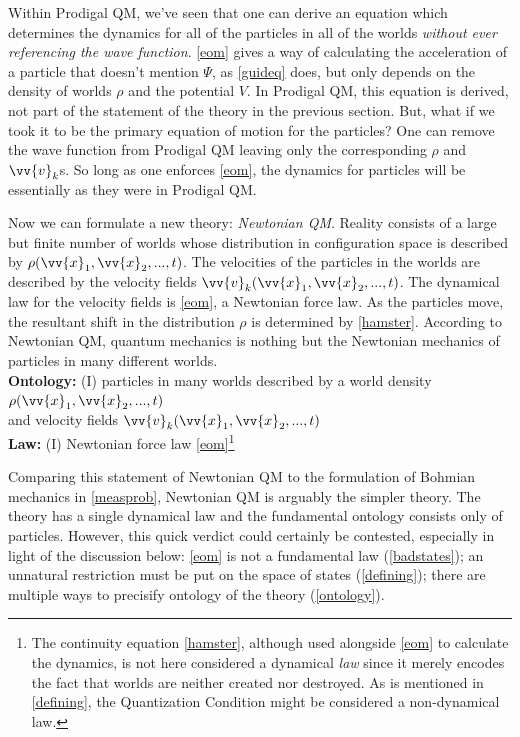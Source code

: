 \documentclass[onecolumn,secnumarabic,balancelastpage,amsmath,amssymb,nofootinbib]{article}
\begin{document}
Within Prodigal QM, we've seen that one can derive an equation which determines the dynamics for all of the particles in all of the worlds \emph{without ever referencing the wave function}.  \eqref{eom} gives a way of calculating the acceleration of a particle that doesn't mention $\Psi$, as \eqref{guideq} does, but only depends on the density of worlds $\rho$ and the potential $V$.  In Prodigal QM, this equation is derived, not part of the statement of the theory in the previous section.  But, what if we took it to be the primary equation of motion for the particles?  One can remove the wave function from Prodigal QM leaving only the corresponding $\rho$ and $\vv{v}_k$s.  So long as one enforces \eqref{eom}, the dynamics for particles will be essentially as they were in Prodigal QM.

Now we can formulate a new theory: \emph{Newtonian QM}.  Reality consists of a large but finite number of worlds whose distribution in configuration space is described by $\rho(\vv{x}_1,\vv{x}_2,...,t)$.  The velocities of the particles in the worlds are described by the velocity fields $\vv{v}_k(\vv{x}_1,\vv{x}_2,...,t)$.  The dynamical law for the velocity fields is \eqref{eom}, a Newtonian force law.  As the particles move, the resultant shift in the distribution $\rho$ is determined by \eqref{hamster}.  According to Newtonian QM, quantum mechanics is nothing but the Newtonian mechanics of particles in many different worlds.
\vspace*{6 pt}\\\hspace*{1.2cm}\textbf{Ontology:} (I) particles in many worlds described by a world density $\rho(\vv{x}_1,\vv{x}_2,...,t)$
\\\hspace*{1.2cm}and velocity fields $\vv{v}_k(\vv{x}_1,\vv{x}_2,...,t)$
\\\hspace*{1.2cm}\textbf{Law:} (I) Newtonian force law \eqref{eom}\footnote{The continuity equation \eqref{hamster}, although used alongside \eqref{eom} to calculate the dynamics, is not here considered a dynamical \emph{law} since it merely encodes the fact that worlds are neither created nor destroyed.  As is mentioned in \textsection \ref{defining}, the Quantization Condition might be considered a non-dynamical law.}\vspace*{6 pt}

Comparing this statement of Newtonian QM to the formulation of Bohmian mechanics in \textsection \ref{measprob}, Newtonian QM is arguably the simpler theory.  The theory has a single dynamical law and the fundamental ontology consists only of particles.  However, this quick verdict could certainly be contested, especially in light of the discussion below: \eqref{eom} is not a fundamental law (\textsection \ref{badstates}); an unnatural restriction must be put on the space of states (\textsection \ref{defining}); there are multiple ways to precisify ontology of the theory (\textsection \ref{ontology}).
\end{document}
